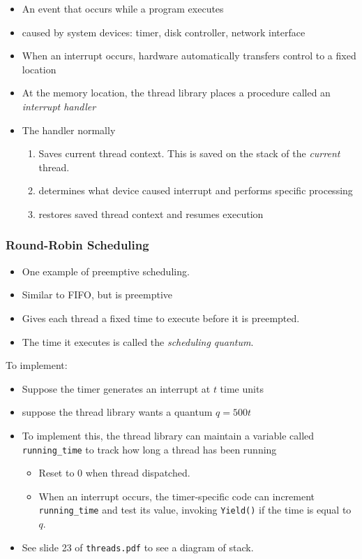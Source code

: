 \documentclass[12pt]{article}
\begin{document}
\begin{itemize}
    \item An event that occurs while a program executes
    \item caused by system devices: timer, disk controller, network interface
    \item When an interrupt occurs, hardware automatically transfers control to
        a fixed location
    \item At the memory location, the thread library places a procedure called
        an \textit{interrupt handler}
    \item The handler normally
        \begin{enumerate}
            \item Saves current thread context. This is saved on the stack of
                the \textit{current} thread.
            \item determines what device caused interrupt and performs specific
                processing
            \item restores saved thread context and resumes execution
        \end{enumerate}
\end{itemize}

\subsubsection{Round-Robin Scheduling}

\begin{itemize}
    \item One example of preemptive scheduling.
    \item Similar to FIFO, but is preemptive
    \item Gives each thread a fixed time to execute before it is preempted.
    \item The time it executes is called the \textit{scheduling quantum}.
\end{itemize}

To implement:
\begin{itemize}
    \item Suppose the timer generates an interrupt at $t$ time units
    \item suppose the thread library wants a quantum $q=500t$
    \item To implement this, the thread library can maintain a variable called
        \texttt{running\_time} to track how long a thread has been running
        \begin{itemize}
            \item Reset to 0 when thread dispatched.
            \item When an interrupt occurs, the timer-specific code can
                increment \texttt{running\_time} and test its value, invoking
                \texttt{Yield()} if the time is equal to $q$.
        \end{itemize}
    \item See slide 23 of \texttt{threads.pdf} to see a diagram of stack.
\end{itemize}
\end{document}
